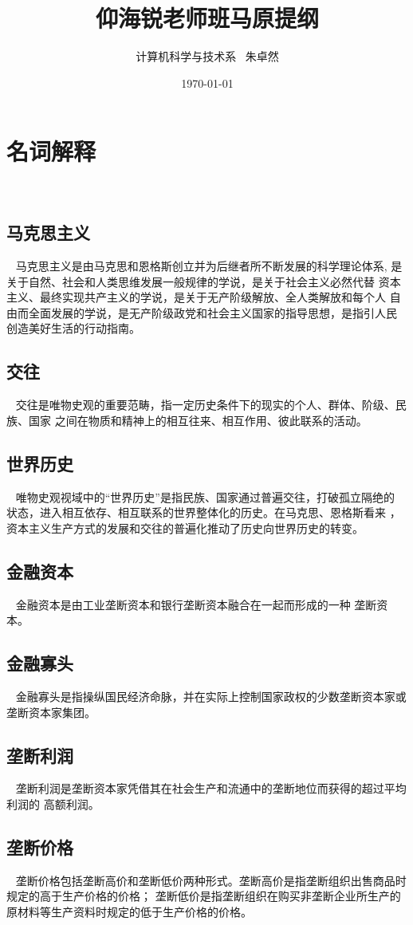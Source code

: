 \documentclass{ctexart}
\title{仰海锐老师班马原提纲}
\author{计算机科学与技术系 \ 朱卓然}
\date{\today}
\begin{document}
\maketitle

\section{名词解释}~{}
\subsection{马克思主义}~{}
马克思主义是由马克思和恩格斯创立并为后继者所不断发展的科学理论体系,
是关于自然、社会和人类思维发展一般规律的学说，是关于社会主义必然代替
资本主义、最终实现共产主义的学说，是关于无产阶级解放、全人类解放和每个人
自由而全面发展的学说，是无产阶级政党和社会主义国家的指导思想，是指引人民
创造美好生活的行动指南。

\subsection{交往}~{}
交往是唯物史观的重要范畴，指一定历史条件下的现实的个人、群体、阶级、民族、国家
之间在物质和精神上的相互往来、相互作用、彼此联系的活动。

\subsection{世界历史}~{}
唯物史观视域中的“世界历史”是指民族、国家通过普遍交往，打破孤立隔绝的
状态，进入相互依存、相互联系的世界整体化的历史。在马克思、恩格斯看来
，资本主义生产方式的发展和交往的普遍化推动了历史向世界历史的转变。

\subsection{金融资本}~{}
金融资本是由工业垄断资本和银行垄断资本融合在一起而形成的一种
垄断资本。
\subsection{金融寡头}~{}
金融寡头是指操纵国民经济命脉，并在实际上控制国家政权的少数垄断资本家或
垄断资本家集团。

\subsection{垄断利润}~{}
垄断利润是垄断资本家凭借其在社会生产和流通中的垄断地位而获得的超过平均利润的
高额利润。
\subsection{垄断价格}~{}
垄断价格包括垄断高价和垄断低价两种形式。垄断高价是指垄断组织出售商品时规定的高于生产价格的价格；
垄断低价是指垄断组织在购买非垄断企业所生产的原材料等生产资料时规定的低于生产价格的价格。
\end{document}
